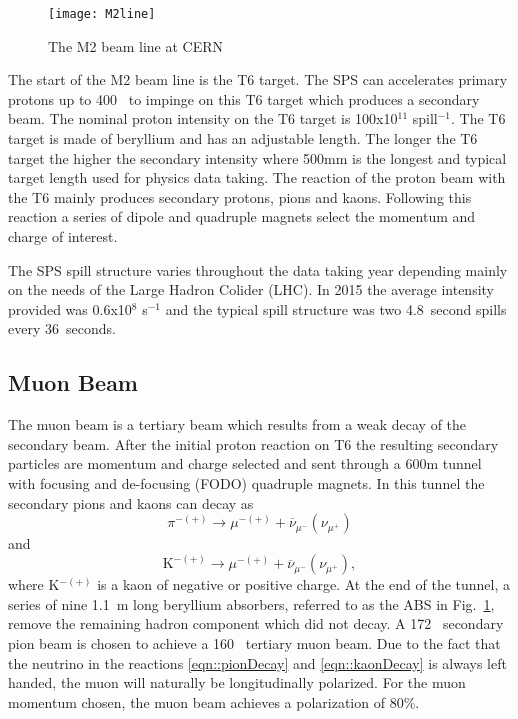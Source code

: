 \begin{figure}[h!t]
  \centering
  \texttt{[image: M2line]}
  \caption{The M2 beam line at CERN}
  \label{fig::M2line}
\end{figure}

The start of the M2 beam line is the T6 target.  The SPS can accelerates primary
protons up to 400~{\gvc} to impinge on this T6 target which produces a secondary
beam.  The nominal proton intensity on the T6 target is 100x10$^{11}$
spill$^{-1}$.  The T6 target is made of beryllium and has an adjustable length.
The longer the T6 target the higher the secondary intensity where 500mm is the
longest and typical target length used for physics data taking.  The reaction of
the proton beam with the T6 mainly produces secondary protons, pions and kaons.
Following this reaction a series of dipole and quadruple magnets select the
momentum and charge of interest. \par

The SPS spill structure varies throughout the data taking year depending mainly
on the needs of the Large Hadron Colider (LHC).  In 2015 the average intensity
provided was 0.6x10$^8$ s$^{-1}$ and the typical spill structure was two
4.8~second spills every 36~seconds.

\subsection{Muon Beam}
The muon beam is a tertiary beam which results from a weak decay of the
secondary beam.  After the initial proton reaction on T6 the resulting secondary
particles are momentum and charge selected and sent through a 600m tunnel with
focusing and de-focusing (FODO) quadruple magnets.  In this tunnel the secondary
pions and kaons can decay as
\begin{equation}
  \pi^{-(+)} \rightarrow \mu^{-(+)} + \overline{\nu}_{\mu^-}(\nu_{\mu^+})
  \label{eqn::pionDecay}
\end{equation}
\noindent
and
\begin{equation}
  \mathrm{K}^{-(+)} \rightarrow \mu^{-(+)} +
  \overline{\nu}_{\mu^-}(\nu_{\mu^+}),
  \label{eqn::kaonDecay}
\end{equation}
\noindent
where K$^{-(+)}$ is a kaon of negative or positive charge.  At the end of the
tunnel, a series of nine 1.1~m long beryllium absorbers, referred to as the ABS
in Fig.~\ref{fig::M2line}, remove the remaining hadron component which did not
decay.  A 172~{\gvc} secondary pion beam is chosen to achieve a 160~{\gvc}
tertiary muon beam.  Due to the fact that the neutrino in the reactions
\ref{eqn::pionDecay} and \ref{eqn::kaonDecay} is always left handed, the muon
will naturally be longitudinally polarized.  For the muon momentum chosen, the
muon beam achieves a polarization of 80\%.

